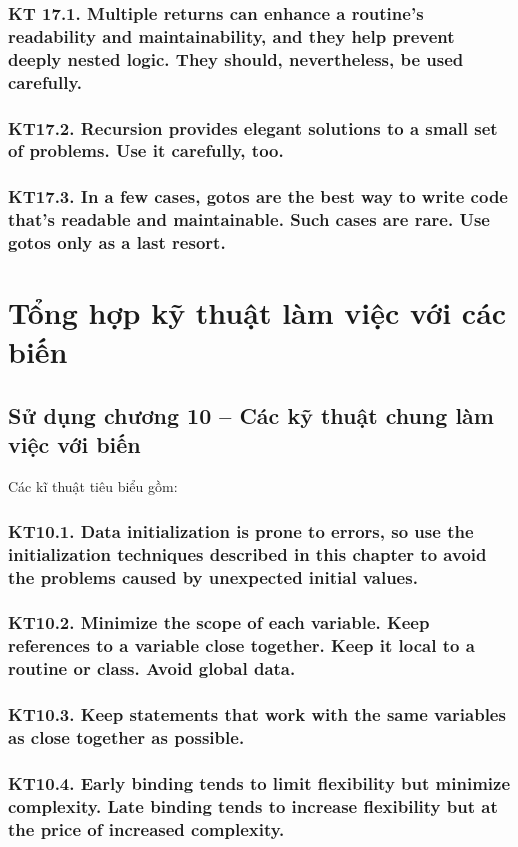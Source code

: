 \documentclass[12pt]{report}
\begin{document}
\subsubsection{KT 17.1. Multiple returns can enhance a routine's readability and maintainability, and they help prevent deeply nested logic. They should, nevertheless, be used carefully.}

\subsubsection{KT17.2. Recursion provides elegant solutions to a small set of problems. Use it carefully, too.}

\subsubsection{KT17.3. In a few cases, gotos are the best way to write code that's readable and maintainable. Such cases are rare. Use gotos only as a last resort.}


\section{\bfseries Tổng hợp kỹ thuật làm việc với các biến}

\subsection{Sử dụng chương 10 -- Các kỹ thuật chung làm việc với biến}
\noindent Các kĩ thuật tiêu biểu gồm:
\subsubsection{KT10.1. Data initialization is prone to errors, so use the initialization techniques described in this chapter to avoid the problems caused by unexpected initial values.}
\subsubsection{KT10.2. Minimize the scope of each variable. Keep references to a variable close together. Keep it local to a routine or class. Avoid global data.}
\subsubsection{KT10.3. Keep statements that work with the same variables as close together as possible.}
\subsubsection{KT10.4. Early binding tends to limit flexibility but minimize complexity. Late binding tends to increase flexibility but at the price of increased complexity.}
\end{document}

